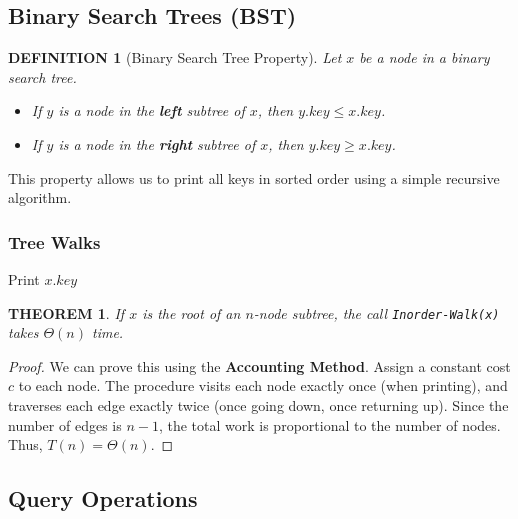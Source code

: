 \documentclass[12pt]{article}
\theoremstyle{blueplain}
\newtheorem{theorem}{THEOREM}[section]
\theoremstyle{bluedef}
\newtheorem{definition}{DEFINITION}[section]
\theoremstyle{blueremark}
\begin{document}
\subsection{Binary Search Trees (BST)}

\begin{definition}[Binary Search Tree Property]
    Let $x$ be a node in a binary search tree.
    \begin{itemize}
        \item If $y$ is a node in the \textbf{left} subtree of $x$, then $y.key \le x.key$.
        \item If $y$ is a node in the \textbf{right} subtree of $x$, then $y.key \ge x.key$.
    \end{itemize}
\end{definition}

This property allows us to print all keys in sorted order using a simple recursive algorithm.

\subsubsection{Tree Walks}

\begin{algorithm}
    \caption{Inorder Tree Walk}\label{alg:inorder}
    \begin{algorithmic}[1]
        \State {}
        \State Print $x.key$
        \State {}
        \EndIf
        \EndProcedure
    \end{algorithmic}
\end{algorithm}

\begin{theorem}
    If $x$ is the root of an $n$-node subtree, the call \texttt{Inorder-Walk(x)} takes $\Theta(n)$ time.
\end{theorem}
\begin{proof}
    We can prove this using the \textbf{Accounting Method}. Assign a constant cost $c$ to each node. The procedure visits each node exactly once (when printing), and traverses each edge exactly twice (once going down, once returning up). Since the number of edges is $n-1$, the total work is proportional to the number of nodes. Thus, $T(n) = \Theta(n)$.
\end{proof}

\subsection{Query Operations}
\end{document}
